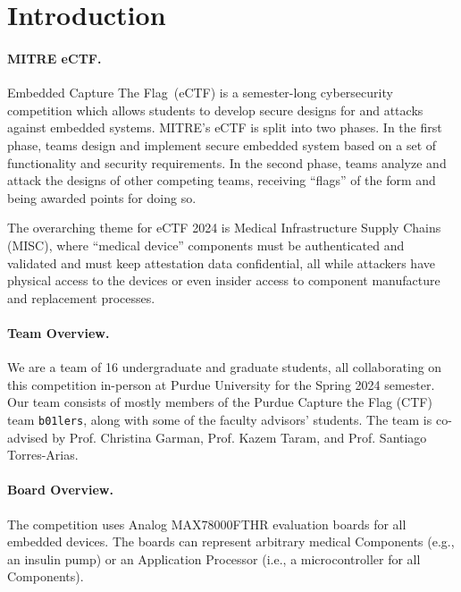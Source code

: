\section{Introduction}
\label{sec:intro}

\iflong
\paragraph{MITRE eCTF.} 
Embedded Capture The Flag\texttrademark~(eCTF) is a semester-long cybersecurity competition which allows students to develop secure designs for and attacks against embedded systems. MITRE's eCTF is split into two phases. In the first phase, teams design and implement secure embedded system based on a set of functionality and security requirements. In the second phase, teams analyze and attack the designs of other competing teams, receiving ``flags'' of the form \flag{\dots} and being awarded points for doing so. 

The overarching theme for eCTF 2024 \cite{eCTFOfficial} is Medical Infrastructure Supply Chains (MISC), where ``medical device'' components must be authenticated and validated and must keep attestation data confidential, all while attackers have physical access to the devices or even insider access to component manufacture and replacement processes.%
\fi

\paragraph{Team Overview.} We are a team of 16 undergraduate and graduate students, all collaborating on this competition in-person at Purdue University for the Spring 2024 semester. Our team consists of mostly members of the Purdue Capture the Flag (CTF) team \texttt{b01lers}, along with some of the faculty advisors' students. The team is co-advised by Prof. Christina Garman, Prof. Kazem Taram, and Prof. Santiago Torres-Arias.

\paragraph{Board Overview.} The competition uses Analog MAX78000FTHR evaluation boards for all embedded devices. The boards can represent arbitrary medical Components (e.g., an insulin pump) or an Application Processor (i.e., a microcontroller for all Components).